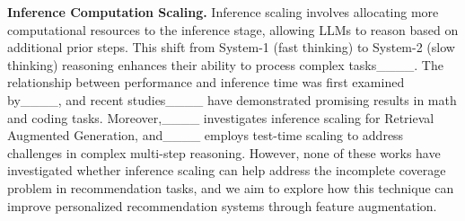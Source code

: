 \textbf{Inference Computation Scaling.} Inference scaling involves allocating more computational resources to the inference stage, allowing LLMs to reason based on additional prior steps. This shift from System-1 (fast thinking) to System-2 (slow thinking) reasoning enhances their ability to process complex tasks____. The relationship between performance and inference time was first examined by____, and recent studies____ have demonstrated promising results in math and coding tasks. Moreover,____ investigates inference scaling for Retrieval Augmented Generation, and____ employs test-time scaling to address challenges in complex multi-step reasoning.
However, none of these works have investigated whether inference scaling can help address the incomplete coverage problem in recommendation tasks, and we aim to explore how this technique can improve personalized recommendation systems through feature augmentation.